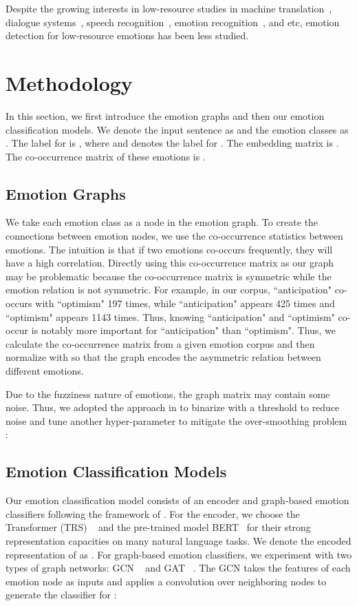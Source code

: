 \documentclass[11pt,a4paper]{article}
\begin{document}
Despite the growing interests in low-resource studies in machine translation~\cite{artetxe2017unsupervised,lample2017unsupervised}, dialogue systems~\cite{bapna2017towards,liu2019zero,liu2020coach}, speech recognition~\cite{miao2013deep,thomas2013deep,winata2020learning}, emotion recognition~\cite{haider2020emotion}, and etc, emotion detection for low-resource emotions has been less studied.


\section{Methodology}
In this section, we first introduce the emotion graphs and then our emotion classification models. We denote the input sentence as  and the emotion classes as . The label for  is , where  and  denotes the label for . The embedding matrix is . The co-occurrence matrix of these emotions is . 

\subsection{Emotion Graphs}
We take each emotion class as a node in the emotion graph. To create the connections between emotion nodes, we use the co-occurrence statistics between emotions. The intuition is that if two emotions co-occurs frequently, they will have a high correlation. Directly using this co-occurrence matrix as our graph may be problematic because the co-occurrence matrix is symmetric while the emotion relation is not symmetric. For example, in our corpus, ``anticipation" co-occurs with ``optimism" 197 times, while ``anticipation" appears 425 times and ``optimism" appears 1143 times. Thus, knowing ``anticipation" and ``optimism" co-occur is notably more important for ``anticipation" than ``optimism". Thus, we calculate the co-occurrence matrix  from a given emotion corpus and then normalize  with  so that the graph encodes the asymmetric relation between different emotions.


Due to the fuzziness nature of emotions, the graph matrix  may contain some noise. Thus, we adopted the approach in \citet{chen2019multi} to binarize  with a threshold  to reduce noise and tune another hyper-parameter  to mitigate the over-smoothing problem \cite{li2018deeper}:


\subsection{Emotion Classification Models}
Our emotion classification model consists of an encoder and graph-based emotion classifiers following the framework of \citet{chen2019multi}. For the encoder, we choose the Transformer (TRS) ~\cite{vaswani2017attention} and the pre-trained model BERT~\cite{devlin2019bert} for their strong representation capacities on many natural language tasks. We denote the encoded representation of  as . For graph-based emotion classifiers, we experiment with two types of graph networks: GCN ~\cite{kipf2016semi} and GAT ~\cite{velivckovic2017graph}. The GCN takes the features of each emotion node as inputs and applies a convolution over neighboring nodes to generate the classifier for :
\end{document}
